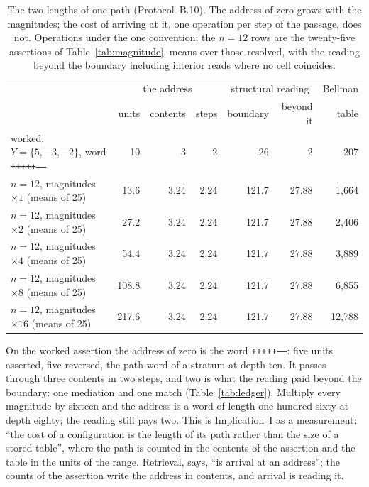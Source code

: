 \documentclass[pdflatex,sn-mathphys-num]{sn-jnl}
\theoremstyle{thmstyleone}%
\theoremstyle{thmstyletwo}%
\theoremstyle{thmstylethree}%
\newcommand{\PA}{\cite{Swanagon2026PA}}
\newcommand{\q}[1]{``#1''}        %
\begin{document}
\begin{table}[!htbp]
\centering\small
\caption{The two lengths of one path (Protocol~B.10). The address of zero grows with the magnitudes; the cost of arriving at it, one operation per step of the passage, does not. Operations under the one convention; the $n=12$ rows are the twenty-five assertions of Table~\ref{tab:magnitude}, means over those resolved, with the reading beyond the boundary including interior reads where no cell coincides.}
\label{tab:pathword}
\setlength{\tabcolsep}{4pt}
\begin{tabular}{lrrrrrr}
\toprule
 & \multicolumn{3}{c}{the address} & \multicolumn{2}{c}{structural reading} & Bellman \\
 & units & contents & steps & boundary & beyond it & table \\
\midrule
worked, $Y=\{5,-3,-2\}$, word \texttt{+++++-----} & 10 & 3 & 2 & 26 & 2 & 207 \\
\midrule
$n=12$, magnitudes $\times1$ (means of 25) & 13.6 & 3.24 & 2.24 & 121.7 & 27.88 & 1,664 \\
$n=12$, magnitudes $\times2$ (means of 25) & 27.2 & 3.24 & 2.24 & 121.7 & 27.88 & 2,406 \\
$n=12$, magnitudes $\times4$ (means of 25) & 54.4 & 3.24 & 2.24 & 121.7 & 27.88 & 3,889 \\
$n=12$, magnitudes $\times8$ (means of 25) & 108.8 & 3.24 & 2.24 & 121.7 & 27.88 & 6,855 \\
$n=12$, magnitudes $\times16$ (means of 25) & 217.6 & 3.24 & 2.24 & 121.7 & 27.88 & 12,788 \\
\bottomrule
\end{tabular}
\end{table}

On the worked assertion the address of zero is the word \texttt{+++++-----}: five units asserted, five reversed, the path-word of a stratum at depth ten. It passes through three contents in two steps, and two is what the reading paid beyond the boundary: one mediation and one match (Table~\ref{tab:ledger}). Multiply every magnitude by sixteen and the address is a word of length one hundred sixty at depth eighty; the reading still pays two. This is Implication~I as a measurement: \q{the cost of a configuration is the length of its path rather than the size of a stored table}, where the path is counted in the contents of the assertion and the table in the units of the range. Retrieval, \PA{} says, \q{is arrival at an address}; the counts of the assertion write the address in contents, and arrival is reading it.
\end{document}
